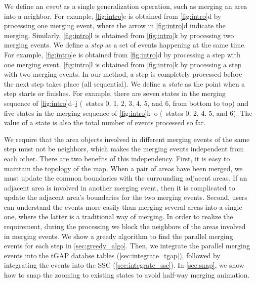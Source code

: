 \documentclass[ijgi,article,submit,moreauthors,pdftex]{Definitions/mdpi}
\begin{document}
We define an \emph{event} as a single generalization operation, 
such as merging an area into a neighbor.
For example, \fig\ref{fig:intro}e is obtained from 
\fig\ref{fig:intro}d by processing one merging event,
where the arrow in \fig\ref{fig:intro}d indicate the merging.
Similarly, \fig\ref{fig:intro}l is obtained from 
\fig\ref{fig:intro}k by processing two merging events.
We define a \emph{step} as 
a set of events happening at the same time.
For example, 
\fig\ref{fig:intro}e is obtained from 
\fig\ref{fig:intro}d by processing a step with one merging event.
\fig\ref{fig:intro}l is obtained from 
\fig\ref{fig:intro}k by processing a step with two merging events.
In our method, a step is completely processed 
before the next step takes place (all sequential).
We define a \emph{state} as the point when a step starts or finishes.
For example, there are seven states in the merging sequence of \figs\ref{fig:intro}d--j
(\ie~states 0, 1, 2, 3, 4, 5, and 6, from bottom to top)
and five states in the merging sequence of \figs\ref{fig:intro}k--o 
(\ie~states 0, 2, 4, 5, and 6).
The value of a state is also the total number of events processed so far.



We require that 
the area objects involved in different merging events of the same step 
must not be neighbors, 
which makes the merging events independent from each other.
There are two benefits of this independency.
First, it is easy to maintain the topology of the map.
When a pair of areas have been merged, 
we must update the common boundaries with the surrounding adjacent areas.
If an adjacent area is involved in another merging event,
then it is complicated to update the adjacent area's boundaries
for the two merging events.
Second, users can understand the events more easily 
than merging several areas into a single one,
where the latter is a traditional way of merging.
In order to realize the requirement, during the processing 
we block the neighbors of the areas involved in merging events.
We show a greedy algorithm to find the parallel merging events for each step
in \sect\ref{sec:greedy_algo}.
Then, we integrate the parallel merging events into the tGAP databse tables
(\sect\ref{sec:integrate_tgap}),
followed by integrating the events into the SSC 
(\sect\ref{sec:integrate_ssc}).
In \sect\ref{sec:snap}, we show how to snap the zooming to existing states
to avoid half-way merging animation.
\end{document}
